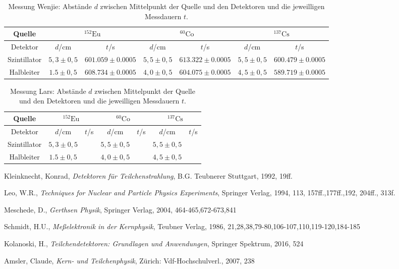 \documentclass[ngerman,11pt]{article}
\begin{document}
\begin{table}
	\centering
	\begin{tabular}{|c|c|c|c|c|c|c|}
		\hline
		Quelle & \multicolumn{2}{|c|}{$^{152}\mathrm{Eu}$}&\multicolumn{2}{|c|}{$^{60}\mathrm{Co}$}&\multicolumn{2}{|c|}{$^{137}\mathrm{Cs}$}\\ \hline
		Detektor& $d$/cm & $t$/s& $d$/cm & $t$/s& $d$/cm & $t$/s\\ \hline
		Szintillator & $5,3\pm0,5$ & $601.059 \pm0.0005$ & $5,5\pm 0,5$ & $613.322\pm0.0005$ & $5,5\pm0,5$ & $600.479 \pm0.0005$\\ \hline
		Halbleiter & $1.5\pm0,5$ & $608.734\pm 0.0005$ & $4,0\pm 0,5$ & $604.075\pm 0.0005$ & $4,5\pm0,5$ &$589.719 \pm 0.0005$ \\ \hline
	\end{tabular}
	\caption{Messung Wenjie: Abst\"ande $d$ zwischen Mittelpunkt der Quelle und den Detektoren und die  jeweilligen Messdauern $t$.}
\end{table}
\begin{table}
	\centering
	\begin{tabular}{|c|c|c|c|c|c|c|}
		\hline
		Quelle & \multicolumn{2}{|c|}{$^{152}\mathrm{Eu}$}&\multicolumn{2}{|c|}{$^{60}\mathrm{Co}$}&\multicolumn{2}{|c|}{$^{137}\mathrm{Cs}$}\\ \hline
		Detektor& $d$/cm & $t$/s& $d$/cm & $t$/s& $d$/cm & $t$/s\\ \hline
		Szintillator & $5,3\pm0,5$ & & $5,5\pm 0,5$ & & $5,5\pm0,5$ & \\ \hline
		Halbleiter & $1.5\pm0,5$ & & $4,0\pm 0,5$ & & $4,5\pm0,5$ & \\ \hline
	\end{tabular}
	\caption{Messung Lars: Abst\"ande $d$ zwischen Mittelpunkt der Quelle und den Detektoren und die jeweilligen Messdauern $t$.}
\end{table}
\newpage
\begin{thebibliography}{9}

	 Kleinknecht, Konrad, \textit{Detektoren für Teilchenstrahlung}, B.G. Teubnerer Stuttgart, 1992, 19ff.

	 Leo, W.R., \textit{Techniques for Nuclear and Particle Physics Experiments}, Springer Verlag, 1994, 113, 157ff.,177ff.,192, 204ff., 313f.

	 Meschede, D., \textit{Gerthsen Physik}, Springer Verlag, 2004, 464-465,672-673,841

	 Schmidt, H.U., \textit{Meßelektronik in der Kernphysik}, Teubner Verlag, 1986, 21,28,38,79-80,106-107,110,119-120,184-185

	 Kolanoski, H., \textit{Teilchendetektoren: Grundlagen und Anwendungen}, Springer Spektrum, 2016, 524

	 Amsler, Claude, \textit{Kern- und Teilchenphysik}, Zürich: Vdf-Hochschulverl., 2007, 238
\end{thebibliography}

\end{document}
